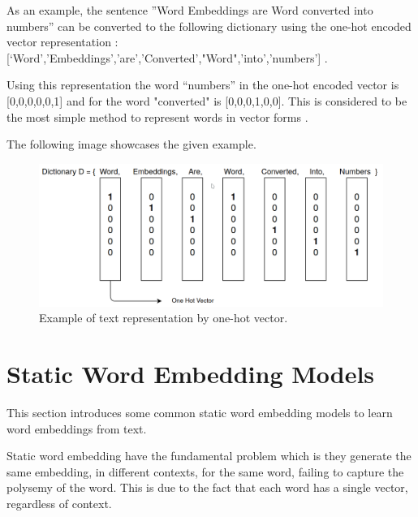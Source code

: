     \par As an example, the sentence ”Word Embeddings are Word converted into numbers” can be converted to the following dictionary using the one-hot encoded vector representation : [‘Word’,’Embeddings’,’are’,’Converted’,"Word",’into’,’numbers’] .

    \par Using this representation the word “numbers” in the one-hot encoded vector is [0,0,0,0,0,1] and for the word "converted" is [0,0,0,1,0,0]. This is considered to be the most simple method to represent words in vector forms \cite{Vidhya2017}.

    \par The following image showcases the given example.
    
    
    \begin{figure}[htb]
        \centering
        \includegraphics[scale = 0.23]{Sections/3StateOfTheArt/3_images/one_hot_encoding.png}
        \caption{Example of text representation by one-hot vector.}   
    \end{figure}
    
    
    



    \section{Static Word Embedding Models}
    \label{sec:static}

    \par This section introduces some common static word embedding models to learn word embeddings from text.


    \par Static word embedding have the fundamental problem which is they generate the same embedding, in different contexts, for the same word, failing to capture the polysemy of the word. This is due to the fact that each word has a single vector, regardless of context. \cite{Mikolov2013}  
   

